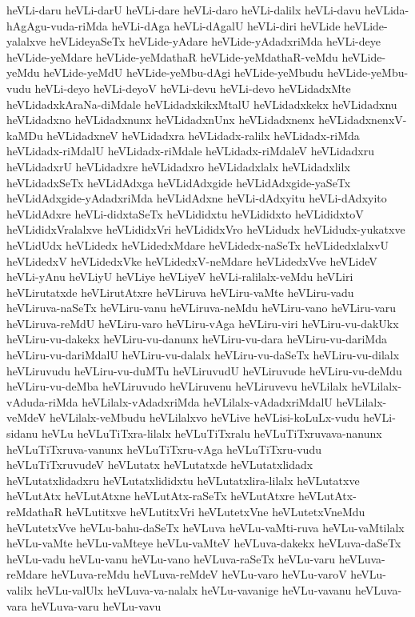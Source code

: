 {heVLi-daru
heVLi-darU
heVLi-dare
heVLi-daro
heVLi-dalilx
heVLi-davu
heVLida-hAgAgu-vuda-riMda
heVLi-dAga
heVLi-dAgalU
heVLi-diri
heVLide
heVLide-yalalxve
heVLideyaSeTx
heVLide-yAdare
heVLide-yAdadxriMda
heVLi-deye
heVLide-yeMdare
heVLide-yeMdathaR
heVLide-yeMdathaR-veMdu
heVLide-yeMdu
heVLide-yeMdU
heVLide-yeMbu-dAgi
heVLide-yeMbudu
heVLide-yeMbu-vudu
heVLi-deyo
heVLi-deyoV
heVLi-devu
heVLi-devo
heVLidadxMte
heVLidadxkAraNa-diMdale
heVLidadxkikxMtalU
heVLidadxkekx
heVLidadxnu
heVLidadxno
heVLidadxnunx
heVLidadxnUnx
heVLidadxnenx
heVLidadxnenxV-kaMDu
heVLidadxneV
heVLidadxra
heVLidadx-ralilx
heVLidadx-riMda
heVLidadx-riMdalU
heVLidadx-riMdale
heVLidadx-riMdaleV
heVLidadxru
heVLidadxrU
heVLidadxre
heVLidadxro
heVLidadxlalx
heVLidadxlilx
heVLidadxSeTx
heVLidAdxga
heVLidAdxgide
heVLidAdxgide-yaSeTx
heVLidAdxgide-yAdadxriMda
heVLidAdxne
heVLi-dAdxyitu
heVLi-dAdxyito
heVLidAdxre
heVLi-didxtaSeTx
heVLididxtu
heVLididxto
heVLididxtoV
heVLididxVralalxve
heVLididxVri
heVLididxVro
heVLidudx
heVLidudx-yukatxve
heVLidUdx
heVLidedx
heVLidedxMdare
heVLidedx-naSeTx
heVLidedxlalxvU
heVLidedxV
heVLidedxVke
heVLidedxV-neMdare
heVLidedxVve
heVLideV
heVLi-yAnu
heVLiyU
heVLiye
heVLiyeV
heVLi-ralilalx-veMdu
heVLiri
heVLirutatxde
heVLirutAtxre
heVLiruva
heVLiru-vaMte
heVLiru-vadu
heVLiruva-naSeTx
heVLiru-vanu
heVLiruva-neMdu
heVLiru-vano
heVLiru-varu
heVLiruva-reMdU
heVLiru-varo
heVLiru-vAga
heVLiru-viri
heVLiru-vu-dakUkx
heVLiru-vu-dakekx
heVLiru-vu-danunx
heVLiru-vu-dara
heVLiru-vu-dariMda
heVLiru-vu-dariMdalU
heVLiru-vu-dalalx
heVLiru-vu-daSeTx
heVLiru-vu-dilalx
heVLiruvudu
heVLiru-vu-duMTu
heVLiruvudU
heVLiruvude
heVLiru-vu-deMdu
heVLiru-vu-deMba
heVLiruvudo
heVLiruvenu
heVLiruvevu
heVLilalx
heVLilalx-vAduda-riMda
heVLilalx-vAdadxriMda
heVLilalx-vAdadxriMdalU
heVLilalx-veMdeV
heVLilalx-veMbudu
heVLilalxvo
heVLive
heVLisi-koLuLx-vudu
heVLi-sidanu
heVLu
heVLuTiTxra-lilalx
heVLuTiTxralu
heVLuTiTxruvava-nanunx
heVLuTiTxruva-vanunx
heVLuTiTxru-vAga
heVLuTiTxru-vudu
heVLuTiTxruvudeV
heVLutatx
heVLutatxde
heVLutatxlidadx
heVLutatxlidadxru
heVLutatxlididxtu
heVLutatxlira-lilalx
heVLutatxve
heVLutAtx
heVLutAtxne
heVLutAtx-raSeTx
heVLutAtxre
heVLutAtx-reMdathaR
heVLutitxve
heVLutitxVri
heVLutetxVne
heVLutetxVneMdu
heVLutetxVve
heVLu-bahu-daSeTx
heVLuva
heVLu-vaMti-ruva
heVLu-vaMtilalx
heVLu-vaMte
heVLu-vaMteye
heVLu-vaMteV
heVLuva-dakekx
heVLuva-daSeTx
heVLu-vadu
heVLu-vanu
heVLu-vano
heVLuva-raSeTx
heVLu-varu
heVLuva-reMdare
heVLuva-reMdu
heVLuva-reMdeV
heVLu-varo
heVLu-varoV
heVLu-valilx
heVLu-valUlx
heVLuva-va-nalalx
heVLu-vavanige
heVLu-vavanu
heVLuva-vara
heVLuva-varu
heVLu-vavu
}
